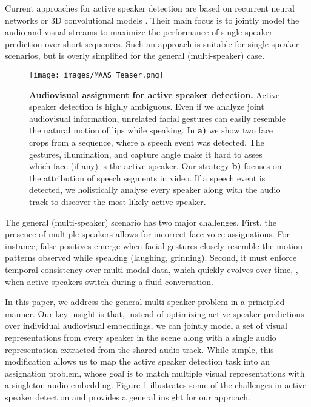\documentclass[10pt,twocolumn,letterpaper]{article}
\begin{document}
Current approaches for active speaker detection are based on recurrent neural networks \cite{roth2019ava, sharma2020crossmodal} or 3D convolutional models \cite{afouras2020self, chung2019naver, zhangmulti}. Their main focus is to jointly model the audio and visual streams to maximize the performance of single speaker prediction over short sequences. Such an approach is suitable for single speaker scenarios, but is overly simplified for the general (multi-speaker) case. 


\begin{figure}[t!]
    \begin{center}
        \texttt{[image: images/MAAS\_Teaser.png]}
    \end{center}
    \caption{\textbf{Audiovisual assignment for active speaker detection.} Active speaker detection is highly ambiguous. Even if we analyze joint audiovisual information, unrelated facial gestures can easily resemble the natural motion of lips while speaking. In \textbf{a)} we show two face crops from a sequence, where a speech event was detected. The gestures, illumination, and capture angle make it hard to asses which face (if any) is the active speaker. Our strategy \textbf{b)} focuses on the attribution of speech segments in video. If a speech event is detected, we holistically analyse every speaker along with the audio track to discover the most likely active speaker.
    }
    \label{fig:teaser}
\end{figure}
 
The general (multi-speaker) scenario has two major challenges. First, the presence of multiple speakers allows for incorrect face-voice assignations. For instance, false positives emerge when facial gestures closely resemble the motion patterns observed while speaking (\eg laughing, grinning). Second, it must enforce temporal consistency over multi-modal data, which quickly evolves over time, \eg, when active speakers switch during a fluid conversation. 

In this paper, we address the general multi-speaker problem in a principled manner. Our key insight is that, instead of optimizing active speaker predictions over individual audiovisual embeddings, we can jointly model a set of visual representations from every speaker in the scene along with a single audio representation extracted from the shared audio track. While simple, this modification allows us to map the active speaker detection task into an assignation problem, whose goal is to match multiple visual representations with a singleton audio embedding. Figure \ref{fig:teaser} illustrates some of the challenges in active speaker detection and provides a general insight for our approach. 
 
\end{document}
